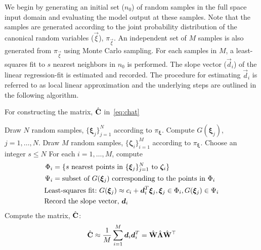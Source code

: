 We begin by generating an initial set ($n_0$) of random samples in the full space input domain
and evaluating the model output at these samples. Note that the samples are generated
according to the joint probability distribution of the canonical random variables
($\vec\xi$), $\pi_\vec\xi$. An independent set of $M$ samples is also generated from $\pi_\vec\xi$
using Monte Carlo sampling. For each samples in $M$, a least-squares fit to $s$ nearest neighbors in
$n_0$ is performed. The slope vector ($\vec{d}_i$) of the linear regression-fit is estimated and recorded.
The procedure for estimating $\vec{d}_i$ is referred to as local linear approximation and the underlying steps
are outlined in the following algorithm. 
%
\bigskip
\begin{breakablealgorithm}
\renewcommand{\algorithmicrequire}{\textbf{Input:}}
\renewcommand{\algorithmicensure}{\textbf{Output:}}
  \caption{For constructing the matrix, $\hat{\mathbf{{C}}}$ in~\eqref{eq:chat}}
  \begin{algorithmic}[1]
	\State Draw $N$ random samples, $\{\bm{\xi}_j\}_{j=1}^{N}$ 
	according to $\pi_{\bm{\xi}}$.
	\State Compute $G(\bm\xi_j)$, $j=1, \ldots, N$.
	\State Draw $M$ random samples, $\{\bm{\zeta}_i\}_{i=1}^{M}$
	according to $\pi_{\bm{\xi}}$.
	\State Choose an integer $s \leq N$ 
	\State For each $i=1, \ldots, M$, compute 
	\[
	\begin{aligned}
	\Phi_i &= \{ s \text{ nearest points in } \{\bm{\xi}_j\}_{j=1}^{N} \text{ to } \bm{\zeta}_i\}\\
	\vspace{-2mm}
	\Psi_i &= \text{subset of } G(\bm\xi_j) \text{ corresponding to the points in } \Phi_i\\
	\vspace{-2mm}
	 &{\color{white}=} \hspace{-7mm} \text{Least-squares fit:~} 
	 G(\bm\xi_j) \approx c_i + \vec{d}_i^T\bm{\xi}_j,  \bm{\xi}_j \in \Phi_i, G(\bm\xi_j) \in \Psi_i\\
	 \vspace{-2mm}
	  &{\color{white}=} \hspace{-7mm}\text{Record the slope vector,}~\vec{d}_i
	\end{aligned}
	\]
	\State Compute the matrix, $\hat{\mathbf{{C}}}$:
	\[
	\hat{\mat{C}} \approx \frac{1}{M} \sum_{i=1}^{M} \vec{d}_i\vec{d}_i^T = \hat{\mat{W}}\hat{\mat{\Lambda}}\hat{\mat{W}}^\top
	\]
	\EndProcedure
  \end{algorithmic}
  \label{alg:lla}
\end{breakablealgorithm}
\bigskip

